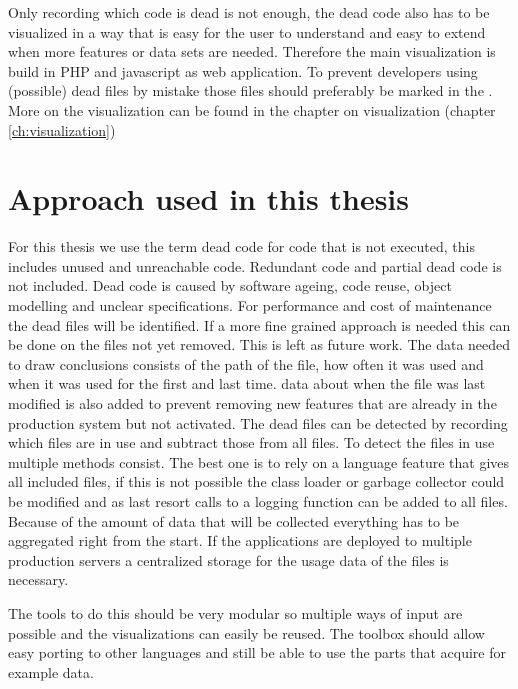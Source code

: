 Only recording which code is dead is not enough, the dead code also has to be visualized in a way that is easy for the user to understand and easy to extend when more features or data sets are needed. Therefore the main visualization is build in PHP and javascript as web application. To prevent developers using (possible) dead files by mistake those files should preferably be marked in the \ide{}. More on the visualization can be found in the chapter on visualization (chapter \ref{ch:visualization})

\section{Approach used in this thesis}
For this thesis we use the term dead code for code that is not executed\cite{chen1998}, this includes unused and unreachable\cite{janota2007} code. Redundant code\cite{janota2007} and partial dead code\cite{knoop1994} is not included. Dead code is caused by software ageing\cite{parnas1994,scanniello2011}, code reuse\cite{liu1999,tempero2008}, object modelling\cite{srivastava1992} and unclear specifications. For performance and cost of maintenance\cite{andreopoulos2004,jones2006} the dead files will be identified. If a more fine grained approach is needed this can be done on the files not yet removed. This is left as future work. The data needed to draw conclusions consists of the path of the file, how often it was used and when it was used for the first and last time. \vcs data about when the file was last modified is also added to prevent removing new features that are already in the production system but not activated. The dead files can be detected by recording which files are in use and subtract those from all files. To detect the files in use multiple methods consist. The best one is to rely on a language feature that gives all included files, if this is not possible the class loader or garbage collector could be modified and as last resort calls to a logging function can be added to all files. Because of the amount of data that will be collected everything has to be aggregated right from the start. If the applications are deployed to multiple production servers a centralized storage for the usage data of the files is necessary.

The tools to do this should be very modular so multiple ways of input are possible and the visualizations can easily be reused. The toolbox should allow easy porting to other languages and still be able to use the parts that acquire for example \vcs data.